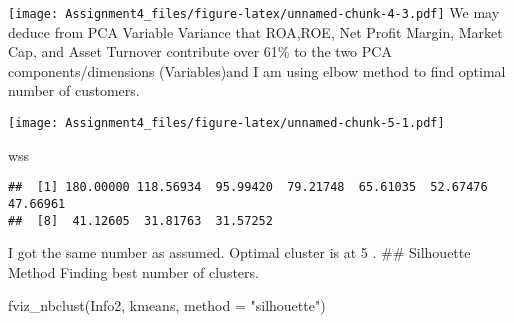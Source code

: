 \documentclass[
]{article}
\newenvironment{Shaded}{\begin{snugshade}}{\end{snugshade}}
\newcommand{\AttributeTok}[1]{\textcolor[rgb]{0.77,0.63,0.00}{#1}}
\newcommand{\ControlFlowTok}[1]{\textcolor[rgb]{0.13,0.29,0.53}{\textbf{#1}}}
\newcommand{\DecValTok}[1]{\textcolor[rgb]{0.00,0.00,0.81}{#1}}
\newcommand{\FunctionTok}[1]{\textcolor[rgb]{0.00,0.00,0.00}{#1}}
\newcommand{\NormalTok}[1]{#1}
\newcommand{\OtherTok}[1]{\textcolor[rgb]{0.56,0.35,0.01}{#1}}
\newcommand{\SpecialCharTok}[1]{\textcolor[rgb]{0.00,0.00,0.00}{#1}}
\newcommand{\StringTok}[1]{\textcolor[rgb]{0.31,0.60,0.02}{#1}}
\begin{document}
\texttt{[image: Assignment4\_files/figure-latex/unnamed-chunk-4-3.pdf]}
We may deduce from PCA Variable Variance that ROA,ROE, Net Profit
Margin, Market Cap, and Asset Turnover contribute over 61\% to the two
PCA components/dimensions (Variables)and I am using elbow method to find
optimal number of customers.

\begin{Shaded}
\end{Shaded}

\texttt{[image: Assignment4\_files/figure-latex/unnamed-chunk-5-1.pdf]}

\begin{Shaded}
\begin{Highlighting}[]
\NormalTok{wss}
\end{Highlighting}
\end{Shaded}

\begin{verbatim}
##  [1] 180.00000 118.56934  95.99420  79.21748  65.61035  52.67476  47.66961
##  [8]  41.12605  31.81763  31.57252
\end{verbatim}

I got the same number as assumed. Optimal cluster is at 5 . \#\#
Silhouette Method Finding best number of clusters.

\begin{Shaded}
\begin{Highlighting}[]
\FunctionTok{fviz\_nbclust}\NormalTok{(Info2, kmeans, }\AttributeTok{method =} \StringTok{"silhouette"}\NormalTok{)}
\end{Highlighting}
\end{Shaded}
\end{document}
